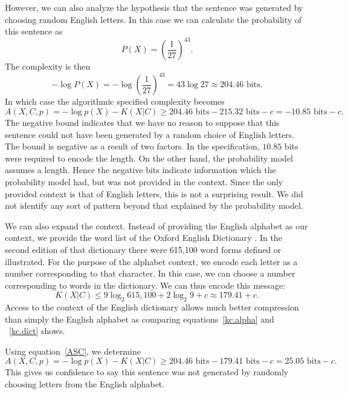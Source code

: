 However, we can also analyze the hypothesis that the sentence was generated by choosing random English letters.
In this case we can calculate the probability of this sentence as
\begin{equation}
    P(X) = \left(\frac{1}{27}\right)^{43} \mbox{.}
\end{equation}
The complexity is then
\begin{equation}
    -\log P(X) = -\log \left(\frac{1}{27}\right)^{43} = 43 \log 27 \approx 204.46 \mbox{ bits.}
\end{equation}
In which case the algorithmic specified complexity becomes
\begin{equation}
    A(X,C,p) = - \log p(X) - K(X|C) \geq 204.46 \mbox{ bits} - 215.32 \mbox{ bits} - c = -10.85 \mbox{ bits} - c \mbox{.}
\end{equation}
The negative bound indicates that we have no reason to suppose that this sentence could not have been generated by a random choice of English letters.
The bound is negative as a result of two factors.
In the specification, $10.85$ bits were required to encode the length.
On the other hand, the probability model assumes a length.
Hence the negative bits indicate information which the probability model had, but was not provided in the context.
Since the only provided context is that of English letters, this is not a surprising result.
We did not identify any sort of pattern beyond that explained by the probability model.

We can also expand the context.
Instead of providing the English alphabet as our context, we provide the word list of the Oxford English Dictionary \citep{Oxford2012}.
In the second edition of that dictionary there were 615,100 word forms defined or illustrated.
For the purpose of the alphabet context, we encode each letter as a number corresponding to that character.
In this case, we can choose a number corresponding to words in the dictionary.
We can thus encode this message:
\begin{equation}
    \label{kc.dict}
    K(X|C) \leq 9 \log_2  615,100 + 2 \log_2 9 + c \approx 179.41 + c \mbox{.}
\end{equation}
Access to the context of the English dictionary allows much better compression than simply the English alphabet as comparing equations~\ref{kc.alpha} and ~\ref{kc.dict} shows.

Using equation~\ref{ASC}, we determine
\begin{equation}
    A(X,C,p) = - \log p(X) - K(X|C) \geq 204.46 \mbox{ bits} - 179.41 \mbox{ bits} - c = 25.05 \mbox{ bits} - c \mbox{.}
\end{equation}
This gives us confidence to say this sentence was not generated by randomly choosing letters from the English alphabet.

